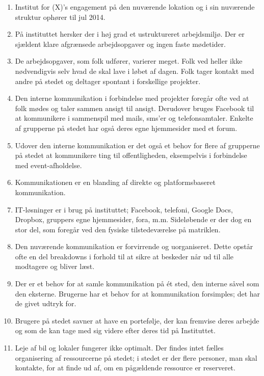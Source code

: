 \begin{enumerate}[i]
	\item Institut for (X)’s engagement på den nuværende lokation og i sin nuværende struktur ophører til jul 2014.
	\item På instituttet hersker der i høj grad et ustruktureret arbejdsmiljø. Der er sjældent klare afgrænsede arbejdsopgaver og ingen faste mødetider.
	\item De arbejdsopgaver, som folk udfører, varierer meget. Folk ved heller ikke nødvendigvis selv hvad de skal lave i løbet af dagen. Folk tager kontakt med andre på stedet og deltager spontant i forskellige projekter.
	\item Den interne kommunikation i forbindelse med projekter foregår ofte ved at folk mødes og taler sammen ansigt til ansigt. Derudover bruges Facebook til at kommunikere i sammenspil med mails, sms’er og telefonsamtaler. Enkelte af grupperne på stedet har også deres egne hjemmesider med et forum.
	\item Udover den interne kommunikation er det også et behov for flere af grupperne på stedet at kommunikere ting til offentligheden, eksempelvis i forbindelse med event-afholdelse.
	\item Kommunikationen er en blanding af direkte og platformsbaseret kommunikation.
	\item IT-løsninger er i brug på instituttet; Facebook, telefoni, Google Docs, Dropbox, gruppers egne hjemmesider, fora, m.m. Sideløbende er der dog en stor del, som foregår ved den fysiske tilstedeværelse på matriklen.
	\item Den nuværende kommunikation er forvirrende og uorganiseret. Dette opstår ofte en del breakdowns i forhold til at sikre at beskeder når ud til alle modtagere og bliver læst.
	\item Der er et behov for at samle kommunikation på ét sted, den interne såvel som den eksterne. Brugerne har et behov for at kommunikation forsimples; det har de givet udtryk for.
	\item Brugere på stedet savner at have en portefølje, der kan fremvise deres arbejde og som de kan tage med sig videre efter deres tid på Instituttet.
	\item Leje af bil og lokaler fungerer ikke optimalt. Der findes intet fælles organisering af ressourcerne på stedet; i stedet er der flere personer, man skal kontakte, for at finde ud af, om en pågældende ressource er reserveret.
\end{enumerate}

